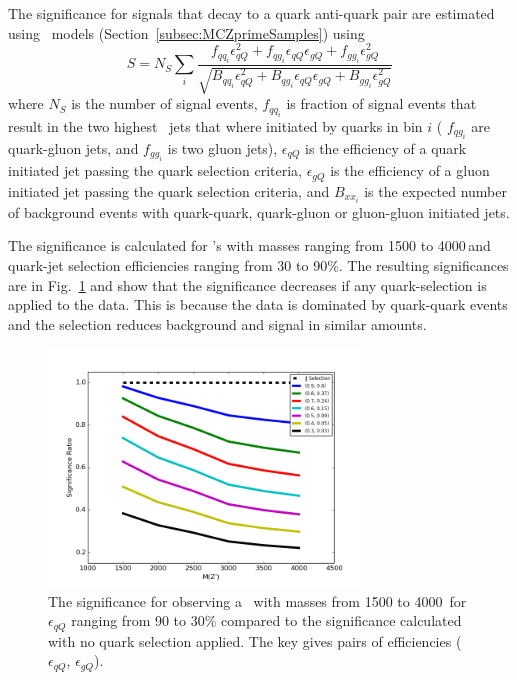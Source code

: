 The significance for signals that decay to a quark anti-quark pair are estimated using \Zprime\ models (Section~\ref{subsec:MCZprimeSamples}) using 
\begin{equation}
S = N_S \sum_i{ \dfrac{ f_{{qq}_i}\epsilon_{qQ}^2 + f_{{qg}_i}\epsilon_{qQ}\epsilon_{gQ} + f_{{gg}_i}\epsilon_{gQ}^2  } {\sqrt{ B_{{qq}_i}\epsilon_{qQ}^2 + B_{{qg}_i}\epsilon_{qQ}\epsilon_{gQ} + B_{{gg}_i}\epsilon_{gQ}^2  }}}
\end{equation}
where $N_S$ is the number of signal events, $f_{{qq}_i}$ is fraction of signal events that result in the two 
highest \pT\ jets that where initiated by quarks in bin $i$ ( $f_{{qg}_i}$ are quark-gluon jets, and $f_{{gg}_i}$ is two gluon jets), 
$\epsilon_{qQ}$ is the efficiency of a quark initiated jet passing the quark selection criteria, 
$\epsilon_{gQ}$ is the efficiency of a gluon initiated jet passing the quark selection criteria, 
and $B_{{xx}_i}$ is the expected number of background events with quark-quark, quark-gluon or gluon-gluon initiated jets. 


The significance is calculated for \Zprime's with masses ranging from 1500 to 4000\,\GeV and quark-jet selection 
efficiencies ranging from 30 to 90\%. The resulting significances are  in Fig.~\ref{fig:QuarkSignalSignificance}
and show that the significance decreases if any quark-selection is applied to the data. This is because
the data is dominated by quark-quark events and the selection reduces background and signal in similar amounts. 

\begin{figure}[htb]
 \centering
\includegraphics[width=0.75\textwidth]{figures/tagging/QuarkSignalSignificance.png}
\caption{ The significance for observing a \Zprime\ with masses from 1500 to 4000\,\GeV
for $\epsilon_{qQ}$ ranging from 90 to 30\% compared to the significance calculated with no quark selection applied. The key gives pairs of efficiencies ($\epsilon_{qQ}$, $\epsilon_{gQ}$).
  \label{fig:QuarkSignalSignificance}}
\end{figure}

